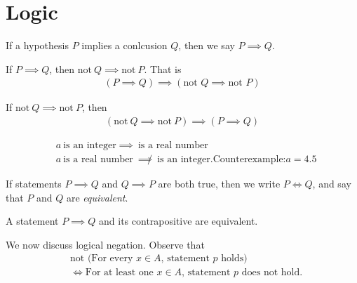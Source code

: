 \section{Logic} 
\begin{notation}
	If a hypothesis $P$ implies a conlcusion $Q$, then we say $P \implies Q$.
\end{notation}
\begin{lemma}[Contrapositive]\label{lem:contrapositive}
	If $P \implies Q $, then $\text{not} \ Q \implies \text{not} \ P$. That is
	\begin{equation*}
		\begin{split}
			( P \implies Q )  \implies \left( \text{not } Q  \implies \text{not }
			P\right) 
		\end{split}
	\end{equation*}
\end{lemma}
\begin{corollary}
	If $\text{not} \ Q  \implies \text{not} \ P $, then
	\begin{equation*}
		\begin{split}
			\left(  \text{not} \ Q   \implies \text{not} \ P\right) \implies (P
			\implies Q) 
		\end{split}
	\end{equation*}
\end{corollary}
\begin{example} 
	\begin{equation*}
		\begin{split}
			& a \ \text{is an integer} \implies  \ \text{is a real number} \\
			& a \ \text{is a real number} \ \not \implies \ \text{is an integer.}
			\text{Counterexample:} a =4.5
		\end{split}
	\end{equation*}
\end{example}
\begin{notation}
	If statements $P \implies Q$ and $Q \implies P$ are both true, then we 
	write $P \iff Q$, and say that $P$ and $Q$ are \emph{equivalent}.
\end{notation}
\begin{example}
	A statement $P \implies Q$ and its contrapositive are equivalent.
\end{example}
We now discuss logical negation. Observe that
\begin{equation*}
	\begin{split}
		& \text{not (For every $x \in A$, statement $p$ holds)} 
		\\
		& \iff \text{For at least one $x \in A$, statement $p$ does not hold.}
	\end{split}
\end{equation*}
